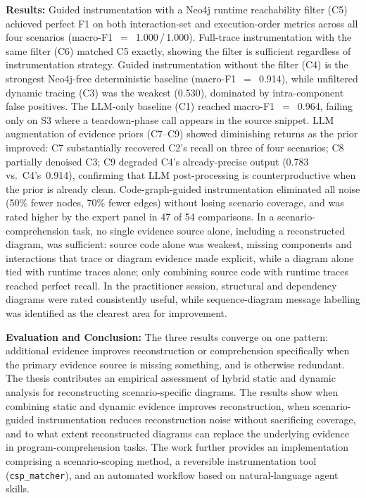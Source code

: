 \textbf{Results:} Guided instrumentation with a Neo4j runtime reachability
filter (C5) achieved perfect F1 on both interaction-set and execution-order
metrics across all four scenarios (macro-F1~$=$~1.000\,/\,1.000). Full-trace
instrumentation with the same filter (C6) matched C5 exactly, showing the
filter is sufficient regardless of instrumentation strategy. Guided
instrumentation without the filter (C4) is the strongest Neo4j-free
deterministic baseline (macro-F1~$=$~0.914), while unfiltered dynamic tracing
(C3) was the weakest (0.530), dominated by intra-component false positives.
The \ac{LLM}-only baseline (C1) reached macro-F1~$=$~0.964, failing only on
S3 where a teardown-phase call appears in the source snippet. \ac{LLM}
augmentation of evidence priors (C7--C9) showed diminishing returns as the
prior improved: C7 substantially recovered C2's recall on three of four
scenarios; C8 partially denoised C3; C9 degraded C4's already-precise output
(0.783\,vs.\ C4's~0.914), confirming that \ac{LLM} post-processing is
counterproductive when the prior is already clean. Code-graph-guided
instrumentation eliminated all noise (50\%
fewer nodes, 70\% fewer edges) without losing scenario coverage, and was
rated higher by the expert panel in 47 of 54 comparisons. In a
scenario-comprehension task, no single evidence source alone, including a
reconstructed diagram, was sufficient: source code alone was weakest,
missing components and interactions that trace or diagram evidence made
explicit, while a diagram alone tied with runtime traces alone; only
combining source code with runtime traces reached perfect recall. In the
practitioner session, structural and dependency diagrams were rated
consistently useful, while sequence-diagram message labelling was
identified as the clearest area for improvement.

\textbf{Evaluation and Conclusion:} The three results converge on one
pattern: additional evidence improves reconstruction or comprehension
specifically when the primary evidence source is missing something, and
is otherwise redundant. The thesis contributes an empirical assessment of
hybrid static and dynamic analysis for reconstructing scenario-specific
\sysml diagrams. The results show when combining static and dynamic
evidence improves reconstruction, when scenario-guided instrumentation
reduces reconstruction noise without sacrificing coverage, and to what
extent reconstructed diagrams can replace the underlying evidence in
program-comprehension tasks. The work further provides an implementation
comprising a scenario-scoping method, a reversible instrumentation tool
(\texttt{csp\_matcher}), and an automated workflow based on
natural-language agent skills.
